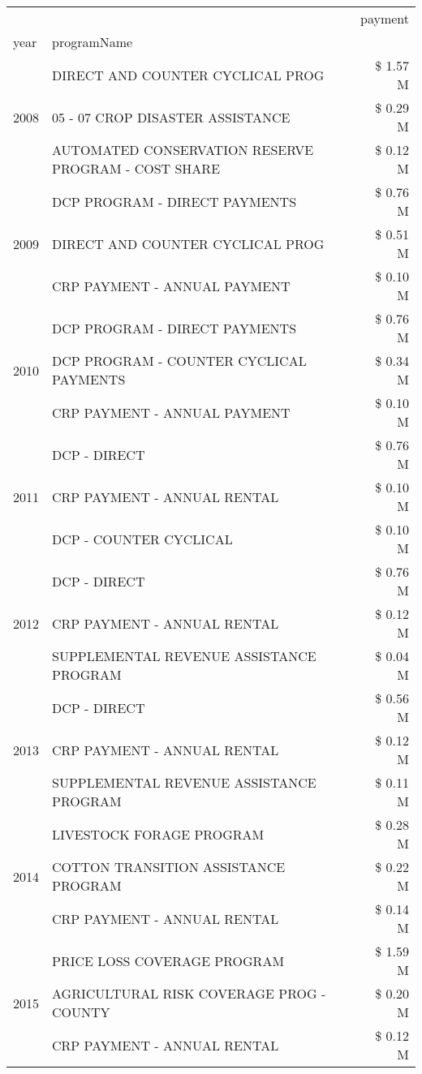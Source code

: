\begin{tabular}{llr}
\toprule
 &  & payment \\
year & programName &  \\
\midrule
\multirow[t]{3}{*}{2008} & DIRECT AND COUNTER CYCLICAL PROG & \$ 1.57 M \\
 & 05 - 07 CROP DISASTER ASSISTANCE & \$ 0.29 M \\
 & AUTOMATED CONSERVATION RESERVE PROGRAM - COST SHARE & \$ 0.12 M \\
\cline{1-3}
\multirow[t]{3}{*}{2009} & DCP PROGRAM - DIRECT PAYMENTS & \$ 0.76 M \\
 & DIRECT AND COUNTER CYCLICAL PROG & \$ 0.51 M \\
 & CRP PAYMENT - ANNUAL PAYMENT & \$ 0.10 M \\
\cline{1-3}
\multirow[t]{3}{*}{2010} & DCP PROGRAM - DIRECT PAYMENTS & \$ 0.76 M \\
 & DCP PROGRAM - COUNTER CYCLICAL PAYMENTS & \$ 0.34 M \\
 & CRP PAYMENT - ANNUAL PAYMENT & \$ 0.10 M \\
\cline{1-3}
\multirow[t]{3}{*}{2011} & DCP - DIRECT & \$ 0.76 M \\
 & CRP PAYMENT - ANNUAL RENTAL & \$ 0.10 M \\
 & DCP - COUNTER CYCLICAL & \$ 0.10 M \\
\cline{1-3}
\multirow[t]{3}{*}{2012} & DCP - DIRECT & \$ 0.76 M \\
 & CRP PAYMENT - ANNUAL RENTAL & \$ 0.12 M \\
 & SUPPLEMENTAL REVENUE ASSISTANCE PROGRAM & \$ 0.04 M \\
\cline{1-3}
\multirow[t]{3}{*}{2013} & DCP - DIRECT & \$ 0.56 M \\
 & CRP PAYMENT - ANNUAL RENTAL & \$ 0.12 M \\
 & SUPPLEMENTAL REVENUE ASSISTANCE PROGRAM & \$ 0.11 M \\
\cline{1-3}
\multirow[t]{3}{*}{2014} & LIVESTOCK FORAGE PROGRAM & \$ 0.28 M \\
 & COTTON TRANSITION ASSISTANCE PROGRAM & \$ 0.22 M \\
 & CRP PAYMENT - ANNUAL RENTAL & \$ 0.14 M \\
\cline{1-3}
\multirow[t]{3}{*}{2015} & PRICE LOSS COVERAGE PROGRAM & \$ 1.59 M \\
 & AGRICULTURAL RISK COVERAGE PROG - COUNTY & \$ 0.20 M \\
 & CRP PAYMENT - ANNUAL RENTAL & \$ 0.12 M \\
\cline{1-3}

\end{tabular}
